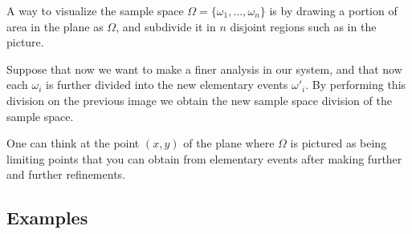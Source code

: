\documentclass[12pt]{article}
\newcommand{\<}{{\langle \!\! \langle}}
\renewcommand{\>}{{\rangle \!\! \rangle}}
\newcommand{\commento}[1]{
	\par\noindent
	\colorbox{light}{\begin{minipage}{120 mm}#1\end{minipage}}
	\par\noindent
}
\begin{document}
A way to visualize the sample space $\Omega=\{\omega_1,...,\omega_n\}$ is by drawing a portion of area in the plane as $\Omega$, and subdivide it in $n$ disjoint regions such as in the picture.  

Suppose that now we want to make a finer analysis in our system, and that now each $\omega_i$ is further divided into the new elementary events $\omega'_i$. By performing this division on the previous image we obtain the new sample space division of the sample space. 
\commento{One can think at the point $(x,y)$ of the plane where $\Omega$ is pictured as being limiting points that you can obtain from elementary events after making further and further refinements.}

%
%
%
%
%
%
%


\subsection{Examples}
\end{document}
